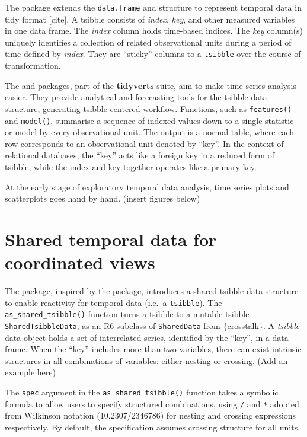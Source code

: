 The  package extends the \texttt{data.frame} and
 structure to represent temporal data in tidy format
{[}cite{]}. A tsibble consists of \emph{index}, \emph{key}, and other
measured variables in one data frame. The \emph{index} column holds
time-based indices. The \emph{key} column(s) uniquely identifies a
collection of related observational units during a period of time
defined by \emph{index}. They are ``sticky'' columns to a
\texttt{tsibble} over the course of transformation.

The  and  packages, part of the
\textbf{tidyverts} suite, aim to make time series analysis easier. They
provide analytical and forecasting tools for the tsibble data structure,
generating tsibble-centered workflow. Functions, such as
\texttt{features()} and \texttt{model()}, summarise a sequence of
indexed values down to a single statistic or model by every
observational unit. The output is a normal table, where each row
corresponds to an observational unit denoted by ``key''. In the context
of relational databases, the ``key'' acts like a foreign key in a
reduced form of tsibble, while the index and key together operates like
a primary key.

At the early stage of exploratory temporal data analysis, time series
plots and scatterplots goes hand by hand. (insert figures below)

\hypertarget{shared-temporal-data-for-coordinated-views}{%
\section{Shared temporal data for coordinated
views}\label{shared-temporal-data-for-coordinated-views}}

The  package, inspired by the 
package, introduces a shared tsibble data structure to enable reactivity
for temporal data (i.e.~a \texttt{tsibble}). The
\texttt{as\_shared\_tsibble()} function turns a tsibble to a mutable
tsibble \texttt{SharedTsibbleData}, as an R6 subclass of
\texttt{SharedData} from \{crosstalk\}. A \emph{tsibble} data object
holds a set of interrelated series, identified by the ``key'', in a data
frame. When the ``key'' includes more than two variables, there can
exist intrinsic structures in all combinations of variables: either
nesting or crossing. (Add an example here)

The \texttt{spec} argument in the \texttt{as\_shared\_tsibble()}
function takes a symbolic formula to allow users to specify structured
combinations, using \texttt{/} and \texttt{*} adopted from Wilkinson
notation (10.2307/2346786) for nesting and crossing expressions
respectively. By default, the specification assumes crossing structure
for all units.

